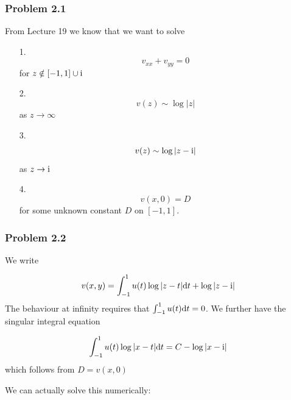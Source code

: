\documentclass[12pt,a4paper]{article}
\def\D{ {\rm d} }
\def\I{ {\rm i} }
\def\dt{\D t}
\begin{document}
\subsubsection{Problem 2.1}
From Lecture 19 we know that we want to solve

\begin{itemize}
\item[1. ] \[
v_{xx} + v_{yy} =0
\]
for $z \notin [-1,1] \cup \I$


\item[2. ] \[
v(z) \sim \log|z|
\]
as $z \rightarrow \infty$


\item[3. ] \[
v(z) \sim \log|z-\I|
\]
as $z \rightarrow \I$


\item[4. ] \[
v(x,0) = D
\]
for some unknown constant $D$ on $[-1,1]$. 

\end{itemize}
\subsubsection{Problem 2.2}
We write

\[
v(x,y) = \int_{-1}^1 u(t) \log|z-t| \dt + \log|z-\I|
\]
The behaviour at infinity requires that $\int_{-1}^1 u(t) \dt = 0$. We further have the singular integral equation

\[
  \int_{-1}^1 u(t) \log|x-t| \dt = C - \log|x-\I|
\]
which follows from $D = v(x,0)$

We can actually solve this numerically:
\end{document}
